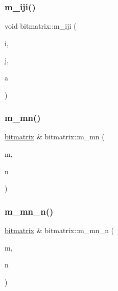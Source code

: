 \subsubsection{\texorpdfstring{m\+\_\+iji()}{m\_iji()}}
{\footnotesize\ttfamily void bitmatrix\+::m\+\_\+iji (\begin{DoxyParamCaption}\item[{\mbox{\hyperlink{galois_8h_a09fddde158a3a20bd2dcadb609de11dc}{I\+NT}}}]{i,  }\item[{\mbox{\hyperlink{galois_8h_a09fddde158a3a20bd2dcadb609de11dc}{I\+NT}}}]{j,  }\item[{\mbox{\hyperlink{galois_8h_a09fddde158a3a20bd2dcadb609de11dc}{I\+NT}}}]{a }\end{DoxyParamCaption})}

\mbox{\label{classbitmatrix_a3511956281a3f36f0013d90a7accc1bc}} 
\subsubsection{\texorpdfstring{m\+\_\+mn()}{m\_mn()}}
{\footnotesize\ttfamily \mbox{\hyperlink{classbitmatrix}{bitmatrix}} \& bitmatrix\+::m\+\_\+mn (\begin{DoxyParamCaption}\item[{\mbox{\hyperlink{galois_8h_a09fddde158a3a20bd2dcadb609de11dc}{I\+NT}}}]{m,  }\item[{\mbox{\hyperlink{galois_8h_a09fddde158a3a20bd2dcadb609de11dc}{I\+NT}}}]{n }\end{DoxyParamCaption})}

\mbox{\label{classbitmatrix_ad2211a81cb808e23924957cb0f8ee817}} 
\subsubsection{\texorpdfstring{m\+\_\+mn\+\_\+n()}{m\_mn\_n()}}
{\footnotesize\ttfamily \mbox{\hyperlink{classbitmatrix}{bitmatrix}} \& bitmatrix\+::m\+\_\+mn\+\_\+n (\begin{DoxyParamCaption}\item[{\mbox{\hyperlink{galois_8h_a09fddde158a3a20bd2dcadb609de11dc}{I\+NT}}}]{m,  }\item[{\mbox{\hyperlink{galois_8h_a09fddde158a3a20bd2dcadb609de11dc}{I\+NT}}}]{n }\end{DoxyParamCaption})}

